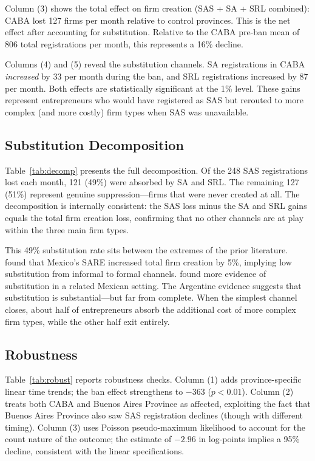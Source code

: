 \documentclass[12pt]{article}
\begin{document}
Column (3) shows the total effect on firm creation (SAS + SA + SRL combined): CABA lost 127 firms per month relative to control provinces. This is the net effect after accounting for substitution. Relative to the CABA pre-ban mean of 806 total registrations per month, this represents a 16\% decline.

Columns (4) and (5) reveal the substitution channels. SA registrations in CABA \textit{increased} by 33 per month during the ban, and SRL registrations increased by 87 per month. Both effects are statistically significant at the 1\% level. These gains represent entrepreneurs who would have registered as SAS but rerouted to more complex (and more costly) firm types when SAS was unavailable.

\subsection{Substitution Decomposition}



Table~\ref{tab:decomp} presents the full decomposition. Of the 248 SAS registrations lost each month, 121 (49\%) were absorbed by SA and SRL. The remaining 127 (51\%) represent genuine suppression---firms that were never created at all. The decomposition is internally consistent: the SAS loss minus the SA and SRL gains equals the total firm creation loss, confirming that no other channels are at play within the three main firm types.

This 49\% substitution rate sits between the extremes of the prior literature. \citet{bruhn2011} found that Mexico's SARE increased total firm creation by 5\%, implying low substitution from informal to formal channels. \citet{kaplan2011entry} found more evidence of substitution in a related Mexican setting. The Argentine evidence suggests that substitution is substantial---but far from complete. When the simplest channel closes, about half of entrepreneurs absorb the additional cost of more complex firm types, while the other half exit entirely.

\subsection{Robustness}



Table~\ref{tab:robust} reports robustness checks. Column (1) adds province-specific linear time trends; the ban effect strengthens to $-363$ ($p < 0.01$). Column (2) treats both CABA and Buenos Aires Province as affected, exploiting the fact that Buenos Aires Province also saw SAS registration declines (though with different timing). Column (3) uses Poisson pseudo-maximum likelihood to account for the count nature of the outcome; the estimate of $-2.96$ in log-points implies a 95\% decline, consistent with the linear specifications.
\end{document}
